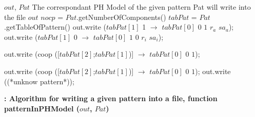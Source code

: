 
\begin{algorithm}
\begin{algorithmic}[H]
\REQUIRE $out$, $Pat$ 
\ENSURE The correspondant PH Model of the given pattern Pat will write into the file $out$
\STATE $nocp$ = $Pat$.getNumberOfComponents() 
\STATE $tabPat$ = $Pat$.getTableOfPattern() 
  \STATE out.write ($tabPat[1]$ 1 $\rightarrow$ $tabPat[0]$ $0$ $1$ $r_{a}$ $sa_{a}$);       
\ENDCASE
{}
  \STATE out.write ($tabPat[1]$ 0 $\rightarrow$ $tabPat[0]$ $1$ $0$ $r_{i}$ $sa_{i}$);    
\ENDSWITCH
   
   
\ENDCASE

   \STATE out.write (coop ([$tabPat[2]$;$tabPat[1]$)] $\rightarrow$ $tabPat[0]$ $0$ $1$); 
        
\ENDCASE
{}
  \STATE out.write (coop ([$tabPat[2]$;$tabPat[1]$)] $\rightarrow$ $tabPat[0]$ $0$ $1$); 
\DEFAULT
 \STATE out.write ((*unknow pattern*));
 \ENDDEFAULT
\ENDSWITCH
   
   
\ENDCASE
\ENDSWITCH
\end{algorithmic}
\caption{\bf: Algorithm for writing a given pattern into a file, function patternInPHModel ($out$, $Pat$)} \label{PHModelGeneration}
\end{algorithm}

